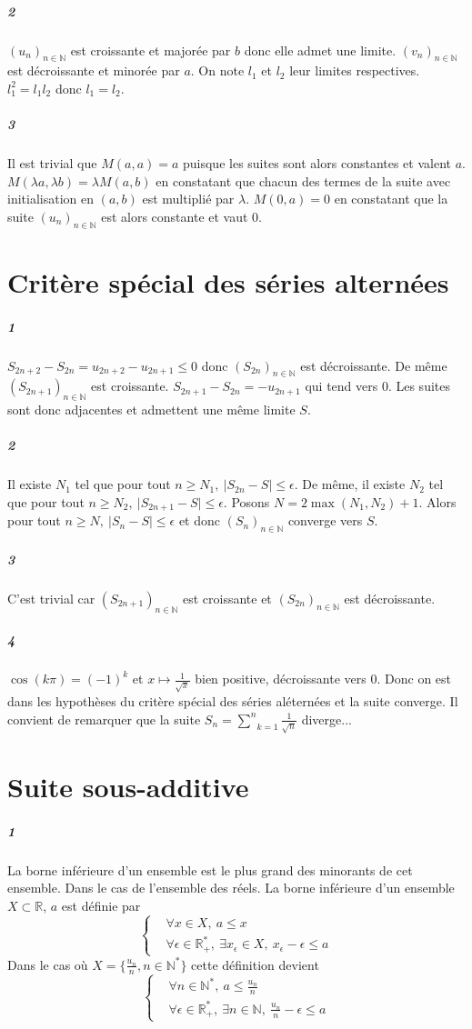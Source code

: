 \documentclass[10pt,a4paper]{article}
\newcommand{\al}[1]{\begin{aligned} #1 \end{aligned}}
\newcommand{\seq}[2]{\left( #1_{#2} \right)_{#2 \in \mathbb{N}} }
\newcommand{\summ}[2]{\underset{#1}{\overset{#2}{\sum}}}
\newcommand{\vertt}[1]{\vert #1 \vert}
\begin{document}
\subparagraph{2}$\seq{u}{n}$ est croissante et majorée par $b$ donc elle admet une limite. $\seq{v}{n}$ est décroissante et minorée par $a$. On note $l_1$ et $l_2$ leur limites respectives. $l_1^2 = l_1 l_2$ donc $l_1 = l_2$.

\subparagraph{3}Il est trivial que $M(a,a) = a$ puisque les suites sont alors constantes et valent $a$. $M(\lambda a, \lambda b) = \lambda M(a,b)$ en constatant que chacun des termes de la suite avec initialisation en $(a,b)$ est multiplié par $\lambda$. $M(0,a) = 0$ en constatant que la suite $\seq{u}{n}$ est alors constante et vaut $0$.

\section{Critère spécial des séries alternées}
\subparagraph{1} $S_{2n+2} - S_{2n} = u_{2n+2} - u_{2n+1} \le 0$ donc $(S_{2n})_{n \in \mathbb{N}}$ est décroissante. De même $(S_{2n+1})_{n\in \mathbb{N}}$ est croissante. $S_{2n+1} - S_{2n} = - u_{2n+1}$ qui tend vers 0. Les suites sont donc adjacentes et admettent une même limite $S$.

\subparagraph{2} Il existe $N_1$ tel que pour tout $n \ge N_1, \ \vertt{S_{2n} - S} \le \epsilon$. De même, il existe $N_2$ tel que pour tout $n \ge N_2, \ \vertt{S_{2n+1} - S} \le \epsilon$. Posons $N = 2 \max(N_1,N_2) +1$. Alors pour tout $n \ge N, \ \vertt{S_n - S} \le \epsilon$ et donc $\seq{S}{n}$ converge vers $S$.

\subparagraph{3}C'est trivial car $(S_{2n+1})_{n \in \mathbb{N}}$ est croissante et $(S_{2n})_{n \in \mathbb{N}}$ est décroissante.

\subparagraph{4}$\cos(k\pi) = (-1)^k$ et $x \mapsto \frac{1}{\sqrt{x}}$ bien positive, décroissante vers 0. Donc on est dans les hypothèses du critère spécial des séries aléternées et la suite converge. Il convient de remarquer que la suite $S_n = \summ{k=1}{n} \frac{1}{\sqrt{n}}$ diverge...

\section{Suite sous-additive}

\subparagraph{1}La borne inférieure d'un ensemble est le plus grand des minorants de cet ensemble. Dans le cas de l'ensemble des réels. La borne inférieure d'un ensemble $X \subset \mathbb{R}$, $a$ est définie par
\[
\left\lbrace
\al{
&\forall x \in X, \ a \le x \\
&\forall \epsilon \in \mathbb{R}_+^*, \ \exists x_{\epsilon} \in X, \ x_{\epsilon}-\epsilon \le a
}
\right.
\]
Dans le cas où $X = \lbrace \frac{u_n}{n}, n \in \mathbb{N}^* \rbrace$ cette définition devient
\[
\left\lbrace
\al{
&\forall n \in \mathbb{N}^*, \ a \le \frac{u_n}{n} \\
&\forall \epsilon \in \mathbb{R}_+^*, \ \exists n \in \mathbb{N}, \ \frac{u_n}{n}-\epsilon \le a
}
\right.
\]
\end{document}
